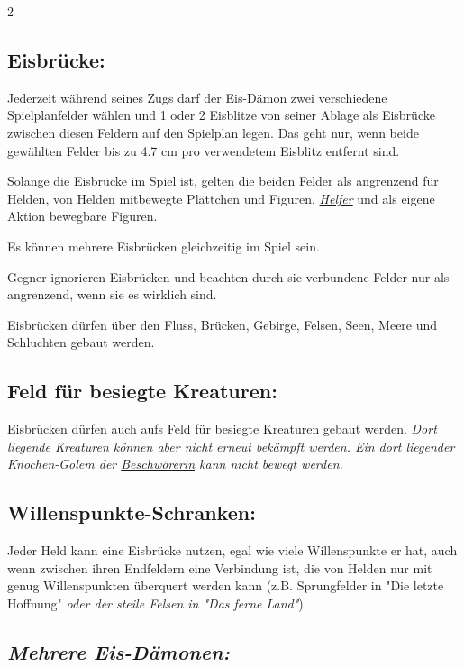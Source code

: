 \documentclass[10pt, a4paper, oneside]{book}
\newcommand{\fan}[1]{\textit{#1}}
\begin{document}
\begin{multicols*}{2}
\begin{nobgcolor}
\subsection{Eisbrücke:}

Jederzeit während seines Zugs darf der Eis-Dämon zwei verschiedene Spielplanfelder wählen und 1 oder 2 Eisblitze von seiner Ablage als Eisbrücke zwischen diesen Feldern auf den Spielplan legen.
\supercite{mh-begleitheft}
Das geht nur, wenn beide gewählten Felder bis zu 4.7 cm pro verwendetem Eisblitz entfernt sind. 

Solange die Eisbrücke im Spiel ist, gelten die beiden Felder als angrenzend für Helden, von Helden mitbewegte Plättchen und Figuren, \hyperref[helfer]{\fan{Helfer}} und als eigene Aktion bewegbare Figuren. 
\supercite{88780}

Es können mehrere Eisbrücken gleichzeitig im Spiel sein.

Gegner ignorieren Eisbrücken und beachten durch sie verbundene Felder nur als angrenzend, wenn sie es wirklich sind.
\supercite{mh-kaelte}

Eisbrücken dürfen über den Fluss, Brücken, Gebirge, Felsen, Seen, Meere und Schluchten gebaut werden.
\supercite{mh-begleitheft}




\subsection{Feld für besiegte Kreaturen:}

Eisbrücken dürfen auch aufs Feld für besiegte Kreaturen gebaut werden.\supercite{88778} \fan{Dort liegende Kreaturen können aber nicht erneut bekämpft werden. Ein dort liegender Knochen-Golem der \hyperref[beschwoererin]{Beschwörerin} kann nicht bewegt werden.}



\subsection{Willenspunkte-Schranken:}

Jeder Held kann eine Eisbrücke nutzen, egal wie viele Willenspunkte er hat, auch wenn zwischen ihren Endfeldern eine Verbindung ist, die von Helden nur mit genug Willenspunkten überquert werden kann (z.B. Sprungfelder in "Die letzte Hoffnung"\supercite{mh11-heldenkarte-eis-daemon} \fan{oder der steile Felsen in "Das ferne Land"}).




\subsection{\fan{Mehrere Eis-Dämonen:}}


\end{nobgcolor}
\end{multicols*}
\end{document}
